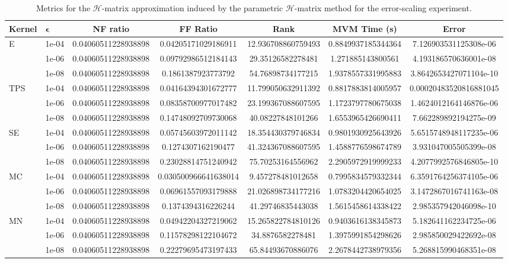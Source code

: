 \documentclass[final,3p,times]{elsarticle}
\newcommand{\mc}[1]{\mathcal{#1}}
\begin{document}
\begin{table}[!ht]
\centering
\scriptsize
\begin{tabular}{llSSSSS}
\hline
\textbf{Kernel} & $\mathbf{\epsilon}$& \textbf{NF ratio} & \textbf{FF Ratio} & \textbf{Rank} & \textbf{MVM Time (s)} & \textbf{Error} \\
\hline
        E & 1e-04 & 0.04060511228938898 & 0.04205171029186911 & 12.936708860759493 & 0.8849937185344364 & 7.126903531125308e-06 \\ 
         & 1e-06 & 0.04060511228938898 & 0.09792986512184143 & 29.35126582278481 & 1.271885143800561 & 4.193186570636001e-08 \\ 
         & 1e-08 & 0.04060511228938898 & 0.1861387923773792 & 54.76898734177215 & 1.9378557331995883 & 3.8642653427071104e-10 \\ \hline
        TPS & 1e-04 & 0.04060511228938898 & 0.04164394301672777 & 11.799050632911392 & 0.8817883814005957 & 0.00020483520816881045 \\ 
         & 1e-06 & 0.04060511228938898 & 0.08358700977017482 & 23.199367088607595 & 1.1723797780675038 & 1.4624012164146876e-06 \\ 
         & 1e-08 & 0.04060511228938898 & 0.14748092709730068 & 40.08227848101266 & 1.6553965426690411 & 7.662289892194275e-09 \\ \hline
        SE & 1e-04 & 0.04060511228938898 & 0.05745603972011142 & 18.354430379746834 & 0.9801930925643926 & 5.6515748948117235e-06 \\ 
         & 1e-06 & 0.04060511228938898 & 0.1274307162190477 & 41.324367088607595 & 1.4588776598674789 & 3.931047005505399e-08 \\ 
         & 1e-08 & 0.04060511228938898 & 0.23028814751240942 & 75.70253164556962 & 2.2905972919999233 & 4.2077992576846805e-10 \\ \hline
        MC & 1e-04 & 0.04060511228938898 & 0.030500966641638014 & 9.457278481012658 & 0.7995834579332344 & 6.3591764256374105e-06 \\ 
         & 1e-06 & 0.04060511228938898 & 0.06961557093179888 & 21.026898734177216 & 1.0783204420654025 & 3.1472867016741163e-08 \\ 
         & 1e-08 & 0.04060511228938898 & 0.1374394316226244 & 41.29746835443038 & 1.5615458614338422 & 2.985357942046098e-10 \\ \hline
        MN & 1e-04 & 0.04060511228938898 & 0.04942204327219062 & 15.265822784810126 & 0.9403616138345873 & 5.182641162234725e-06 \\ 
         & 1e-06 & 0.04060511228938898 & 0.11578298122104672 & 34.8876582278481 & 1.3975991854298626 & 2.985850029422692e-08 \\ 
         & 1e-08 & 0.04060511228938898 & 0.22279695473197433 & 65.84493670886076 & 2.2678442738979356 & 5.268815990468351e-08 \\ \hline
\end{tabular}
\caption{Metrics for the $\mc{H}$-matrix approximation induced by the parametric $\mc{H}$-matrix method for the error-scaling experiment.}
\label{tab:ph_matrix_induced_err}
\end{table}
\end{document}
